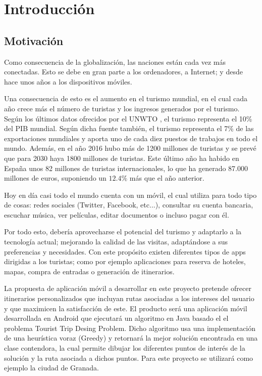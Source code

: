 \chapter{Introducción}

\section[Motivación]{Motivación}
Como consecuencia de la globalización, las naciones están cada vez más conectadas. Esto se debe en gran parte a los ordenadores, a Internet; y desde hace unos años a los dispositivos móviles.\newline

Una consecuencia de esto es el aumento en el turismo mundial, en el cual cada año crece más el número de turistas y los ingresos generados por el turismo. Según los últimos datos ofrecidos por el UNWTO \cite{unwto_resumen}, el turismo representa el 10\% del PIB mundial. Según dicha fuente también, el turismo representa el 7\% de las exportaciones mundiales y aporta uno de cada diez puestos de trabajos en todo el mundo. Además, en el año 2016 hubo más de 1200 millones de turistas y se prevé que para 2030 haya 1800 millones de turistas. Este último año ha habido en España unos 82 millones de turistas internacionales, lo que ha generado 87.000 millones de euros, suponiendo un $12.4\%$ más que el año anterior.\newline

Hoy en día casi todo el mundo cuenta con un móvil, el cual utiliza para todo tipo de cosas: redes sociales (Twitter, Facebook, etc...), consultar su cuenta bancaria, escuchar música, ver películas, editar documentos o incluso pagar con él.\newline

Por todo esto, debería aprovecharse el potencial del turismo y adaptarlo a la tecnología actual; mejorando la calidad de las visitas, adaptándose a sus preferencias y necesidades. Con este propósito existen diferentes tipos de apps dirigidas a los turistas; como por ejemplo aplicaciones para reserva de hoteles, mapas, compra de entradas o generación de itinerarios.\newline

La propuesta de aplicación móvil a desarrollar en este proyecto pretende ofrecer itinerarios personalizados que incluyan rutas asociadas a los intereses del usuario y que maximicen la satisfacción de este. El producto será una aplicación móvil desarrollada en Android que ejecutará un algoritmo en Java basado el el problema Tourist Trip Desing Problem. Dicho algoritmo usa una implementación de una heurística voraz (Greedy) y retornará la mejor solución encontrada en una clase contendora, la cual permite dibujar los diferentes puntos de interés de la solución y la ruta asociada a dichos puntos. Para este proyecto se utilizará como ejemplo la ciudad de Granada.


